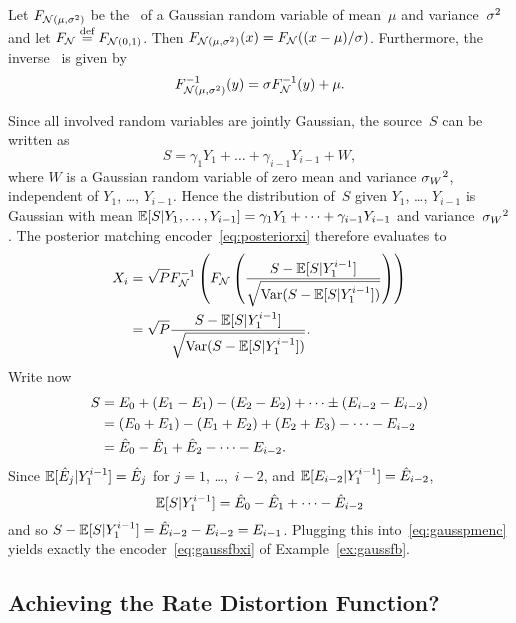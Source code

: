 \begin{example}
  \label{ex:gaussfbpost}
  Let $F_{{\mathcal{N}}(\mu, {\sigma^2})}$ be the \cdf\ of a Gaussian random variable of
  mean~$\mu$ and variance~${\sigma^2}$ and let $F_{\mathcal{N}} \stackrel{\text{def}}{=} F_{{\mathcal{N}}(0,1)}$. Then
  $F_{{\mathcal{N}}(\mu,{\sigma^2})}(x) = F_{\mathcal{N}}((x-\mu)/\sigma)$. Furthermore, the inverse \cdf\ is
  given by
  \begin{equation*}
    F_{{\mathcal{N}}(\mu,{\sigma^2})}^{-1}(y) = \sigma F_{\mathcal{N}}^{-1}(y) + \mu.
  \end{equation*}

  Since all involved random variables are jointly Gaussian, the source~$S$ can
  be written as
  \begin{equation*}
    S = \gamma_1 Y_1 + \dots + \gamma_{i-1} Y_{i-1} + W,
  \end{equation*}
  where $W$ is a Gaussian random variable of zero mean and variance ${{\sigma_W}^2}$,
  independent of $Y_1$, \ldots, $Y_{i-1}$. Hence the distribution of~$S$ given
  $Y_1$, \ldots, $Y_{i-1}$ is Gaussian with mean $\mathbb{E}[S|Y_1, \dots, Y_{i-1}] =
  \gamma_1 Y_1 + \dots + \gamma_{i-1} Y_{i-1}$ and variance~${{\sigma_W}^2}$.  The
  posterior matching encoder~\eqref{eq:posteriorxi} therefore evaluates to
  \begin{align}
    X_i &= \sqrt{P} F_{\mathcal{N}}^{-1}\left( F_{\mathcal{N}}\left( \frac{S - \mathbb{E}[S|Y_1^{i-1}]}
    {\sqrt{\operatorname{Var}(S - \mathbb{E}[S|Y_1^{i-1}])}} \right) \right) \nonumber \\
    \label{eq:gausspmenc}
    &= \sqrt{P} \frac{S - \mathbb{E}[S|Y_1^{i-1}]}
    {\sqrt{\operatorname{Var}(S - \mathbb{E}[S|Y_1^{i-1}])}} .
  \end{align}
  Write now
  \begin{align*}
    S &= E_0 + (E_1 - E_1) - (E_2 - E_2) + \dots \pm (E_{i-2} -
    E_{i-2}) \\
    &= (E_0 + E_1) - (E_1 + E_2) + (E_2 + E_3) - \dots - E_{i-2} \\
    &= \hat{E}_0 - \hat{E}_1 + \hat{E}_2 - \dots - E_{i-2}.
  \end{align*}
  Since $\mathbb{E}[\hat{E}_j | Y_1^{i-1}] = \hat{E}_j$ for $j = 1$, \dots,~$i-2$, and
  $\mathbb{E}[E_{i-2}|Y_1^{i-1}] = \hat{E}_{i-2}$, 
  \begin{equation*}
    \mathbb{E}[S|Y_1^{i-1}] = \hat{E}_0 - \hat{E}_1 + \dots  - \hat{E}_{i-2}
  \end{equation*}
  and so $S - \mathbb{E}[S|Y_1^{i-1}] = \hat{E}_{i-2} - E_{i-2} = E_{i-1}$. Plugging this
  into~\eqref{eq:gausspmenc} yields exactly the encoder~\eqref{eq:gaussfbxi} of
  Example~\ref{ex:gaussfb}.
\end{example}


\subsection{Achieving the Rate Distortion Function?}

